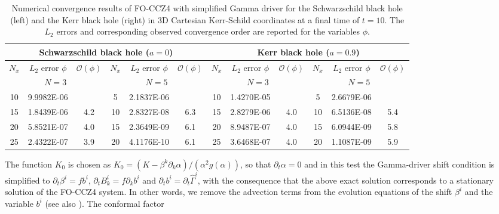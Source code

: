 \begin{table}[b]
	\caption[
	   Convergence results for different BH coordinates, 
	]{Numerical convergence results of FO-CCZ4 with simplified Gamma
		driver for the Schwarzschild black hole (left) and the Kerr black
		hole (right) in 3D Cartesian Kerr-Schild coordinates at a final time
		of $t=10$.  The $L_2$ errors and corresponding observed convergence
		order are reported for the variables $\phi$.}
	\label{tab.conv.bh}
	\vspace{.5cm}%
	\renewcommand{\arraystretch}{1.0}
	\begin{tabular}{cccccccccccc}
		\hline
		\multicolumn{6}{c}{\textbf{Schwarzschild black hole} ($a=0$)}   & \multicolumn{6}{c}{\textbf{Kerr black hole} ($a=0.9$)}   \\
		\hline
		$N_x$ & ${L_2}$ error $\phi$ & $\mathcal{O}(\phi)$  & $N_x$ & ${L_2}$ error $\phi$ & $\mathcal{O}(\phi)$  &
		$N_x$ & ${L_2}$ error $\phi$ & $\mathcal{O}(\phi)$  & $N_x$ & ${L_2}$ error $\phi$ & $\mathcal{O}(\phi)$  \\
		\hline
		\multicolumn{3}{c}{$N=3$}  &  \multicolumn{3}{c}{$N=5$}    &
		\multicolumn{3}{c}{$N=3$}  &  \multicolumn{3}{c}{$N=5$}    \\
		\hline
		10	& 9.9982E-06	&     &   5 & 2.1837E-06 &     & 10	& 1.4270E-05	&     &   5 & 2.6679E-06 &     \\
		15	& 1.8439E-06	& 4.2	&  10 & 2.8327E-08 & 6.3 & 15	& 2.8279E-06	& 4.0 &  10 & 6.5136E-08 & 5.4    \\
		20	& 5.8521E-07	& 4.0	&  15 & 2.3649E-09 & 6.1 & 20	& 8.9487E-07	& 4.0 &  15 & 6.0944E-09 & 5.8    \\
		25	& 2.4322E-07	& 3.9	&  20 & 4.1176E-10 & 6.1 & 25	& 3.6468E-07	& 4.0 &  20 & 1.1087E-09 & 5.9    \\
		\hline
	\end{tabular}
\end{table}
%
The function $K_0$ is chosen as $K_0 = \left( K - \beta^k \partial_k
\alpha \right)/{\left(\alpha^2 g(\alpha)\right)}$, so that $ \partial_t
\alpha = 0$ and in this test the Gamma-driver shift condition is
simplified to $\partial_t \beta^i = f b^i$, $\partial_t B_k^i = f
\partial_k b^i$ and $\partial_t b^i = \partial_t \hat{\Gamma}^i$, with
the consequence that the above exact solution corresponds to a stationary
solution of the FO-CCZ4 system. In other words, we remove the advection
terms from the evolution equations of the shift $\beta^i$ and the
variable $b^i$ (see also \cite{Alcubierre:2008}). The conformal factor
